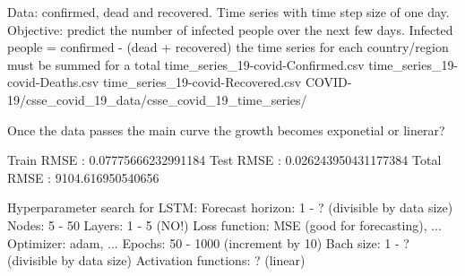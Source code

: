 Data: confirmed, dead and recovered. Time series with time step size of one day.
Objective: predict the number of infected people over the next few days.
Infected people = confirmed - (dead + recovered) {the time series for each country/region must be summed for a total}
time_series_19-covid-Confirmed.csv  time_series_19-covid-Deaths.csv  time_series_19-covid-Recovered.csv 
COVID-19/csse_covid_19_data/csse_covid_19_time_series/

Once the data passes the main curve the growth becomes exponetial or linerar?

Train RMSE : 0.07775666232991184
Test RMSE : 0.026243950431177384
Total RMSE : 9104.616950540656


Hyperparameter search for LSTM:
Forecast horizon: 1 - ? (divisible by data size)
Nodes: 5 - 50
Layers: 1 - 5 (NO!)
Loss function: MSE (good for forecasting), ...
Optimizer: adam, ...
Epochs: 50 - 1000 (increment by 10)
Bach size: 1 - ? (divisible by data size)
Activation functions: ? (linear)
